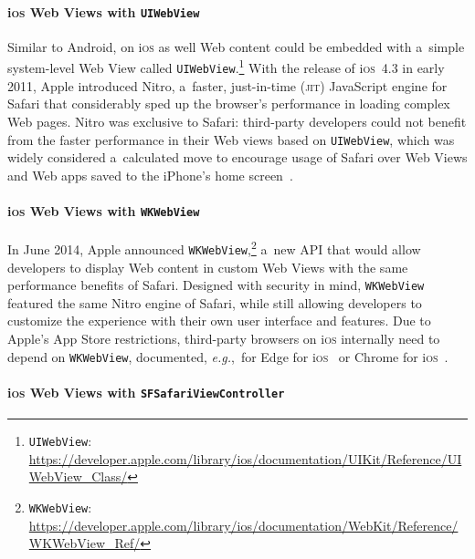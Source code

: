 \documentclass[sigconf]{acmart}
\begin{document}
\paragraph{i\textsc{os} Web Views with \texttt{UIWebView}}

Similar to Android, on i\textsc{os} as well Web content could be embedded with
a~simple system-level Web View called \texttt{UIWebView}.\footnote{\texttt{UIWebView}:
\url{https://developer.apple.com/library/ios/documentation/UIKit/Reference/UIWebView_Class/}}
With the release of i\textsc{os}~4.3 in early 2011, Apple introduced Nitro,
a~faster, just-in-time (\textsc{jit}) JavaScript engine for Safari
that considerably sped up the browser's performance in loading complex Web pages.
Nitro was exclusive to Safari: third-party developers could not benefit
from the faster performance in their Web views based on \texttt{UIWebView},
which was widely considered a~calculated move to encourage usage of Safari
over Web Views and Web apps saved to the iPhone's home screen~\cite{viticci2015safari}.

\paragraph{i\textsc{os} Web Views with \texttt{WKWebView}}

In June 2014, Apple announced \texttt{WKWebView},\footnote{\texttt{WKWebView}:
\url{https://developer.apple.com/library/ios/documentation/WebKit/Reference/WKWebView_Ref/}}
a~new API that would allow developers
to display Web content in custom Web Views with the same performance benefits of Safari.
Designed with security in mind, \texttt{WKWebView} featured the same Nitro engine of Safari,
while still allowing developers to customize the experience
with their own user interface and features.
Due to Apple's App Store restrictions, third-party browsers on i\textsc{os}
internally need to depend on \texttt{WKWebView}, documented,
\emph{e.g.},\ for Edge for i\textsc{os}~\cite{lyndersay2017edge}
or Chrome for i\textsc{os}~\cite{chromiumblog2016chrome}.

\paragraph{i\textsc{os} Web Views with \texttt{SFSafariViewController}}
\end{document}
